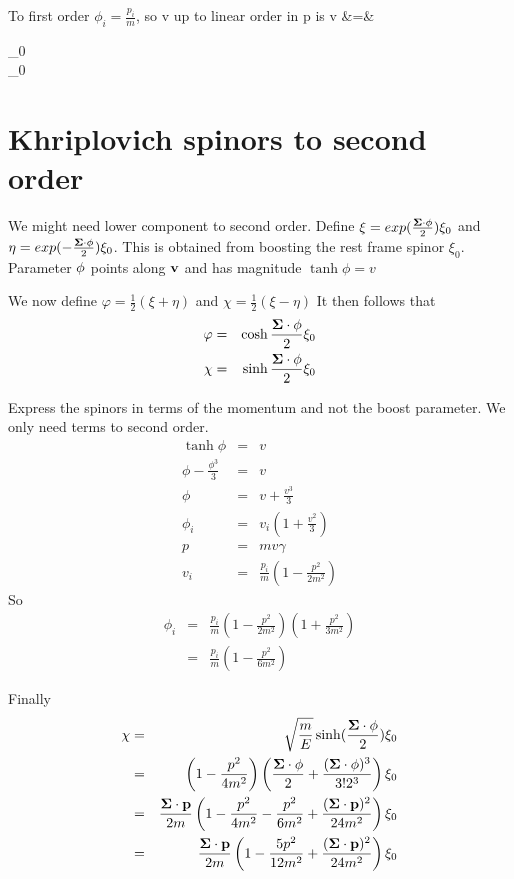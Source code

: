 To first order $ \phi_i = \frac{p_i}{m}$, so v up to linear order in p is
\beqa
	v &=& \begin{pmatrix} 	 \xi_0\\	
			 \xi_0	\end{pmatrix}
\eeqa
\section{Khriplovich spinors to second order}


We might need lower component to second order.
Define $\xi = exp(\frac{\mathbf{\Sigma} \cdot \mathbf{\phi}}{2} )\xi_0$ and $\eta = exp(-\frac{\mathbf{\Sigma} \cdot \mathbf{\phi}}{2} )\xi_0$.
This is obtained from boosting the rest frame spinor $\xi_0$.  Parameter $\mathbf{\phi}$ points along $\mathbf{v}$ and has magnitude $\tanh \phi = v$

We now define $\varphi = \frac{1}{2} ( \xi + \eta)$ and $\chi = \frac{1}{2} ( \xi - \eta)$  It then follows that
\begin{eqnarray*}
	\varphi &=& \cosh{ \frac{\ensuremath{\mathbf{\Sigma}} \cdot \ensuremath{\mathbf{\phi}}}{2} } \xi_0	\\
	\chi &=& \sinh{ \frac{\ensuremath{\mathbf{\Sigma}} \cdot \ensuremath{\mathbf{\phi}}}{2} } \xi_0	\\	
\end{eqnarray*}

Express the spinors in terms of the momentum and not the boost parameter.  We only need terms to second order.
\begin{eqnarray*}
	\tanh \phi &=& v 	\\
	\phi  - \frac{\phi^3}{3} &=& v	\\
	\phi &=& v +\frac{v^3}{3}	\\
	\phi_i &=& v_i \left( 1 + \frac{v^2}{3} \right )	\\
	p &=& mv\gamma 	\\
	v_i &=& \frac{p_i}{m} \left( 1 -\frac{p^2}{2m^2} \right )	
\end{eqnarray*}
So
\begin{eqnarray*}
	\phi_i &=& \frac{p_i}{m}\left( 1 - \frac{p^2}{2m^2} \right ) \left ( 1 + \frac{p^2}{3m^2} \right )	\\
		&=& \frac{p_i}{m}\left( 1 - \frac{p^2}{6m^2} \right )
\end{eqnarray*}

Finally
\begin{eqnarray*}
	\chi &=& \sqrt{\frac{m}{E}} \sinh( \frac{\mathbf{\Sigma} \cdot \mathbf{\phi}}{2} ) \xi_0	\\
		&=& \left( 1 - \frac{p^2}{4m^2} \right ) \left( 
			\frac{\mathbf{\Sigma} \cdot \mathbf{\phi}}{2} + \frac{(\mathbf{\Sigma} \cdot \mathbf{\phi})^3}{3!2^3 }
			\right) \xi_0	\\
		&=&	\frac{\mathbf{\Sigma} \cdot \mathbf{p}}{2m} \left ( 1 - \frac{p^2}{4m^2} - \frac{p^2}{6m^2} + \frac{(\mathbf{\Sigma} \cdot \mathbf{p})^2}{24m^2} \right )\xi_0	\\
		&=&	\frac{\mathbf{\Sigma} \cdot \mathbf{p}}{2m} \left ( 1 - \frac{5p^2}{12m^2}  + \frac{(\mathbf{\Sigma} \cdot \mathbf{p})^2}{24m^2} \right )\xi_0
\end{eqnarray*}

